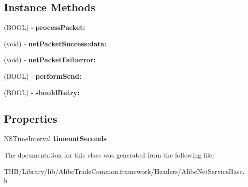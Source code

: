 \subsection*{Instance Methods}
\begin{DoxyCompactItemize}
\item 
\mbox{\label{interface_alibc_net_service_base_a295c051b33b3daa1401be9b3e53b78d7}} 
(B\+O\+OL) -\/ {\bfseries process\+Packet\+:}
\item 
\mbox{\label{interface_alibc_net_service_base_af34cab3a4c3c8341a219e5e6d39fc7ab}} 
(void) -\/ {\bfseries net\+Packet\+Success\+:data\+:}
\item 
\mbox{\label{interface_alibc_net_service_base_aaeb20a70cce1d65ec4084146f3966d54}} 
(void) -\/ {\bfseries net\+Packet\+Fail\+:error\+:}
\item 
\mbox{\label{interface_alibc_net_service_base_a20fd9bfe5273aa03b0f2fe9480e34883}} 
(B\+O\+OL) -\/ {\bfseries perform\+Send\+:}
\item 
\mbox{\label{interface_alibc_net_service_base_a8941633220db9e7aa13cb9c8a81c8895}} 
(B\+O\+OL) -\/ {\bfseries should\+Retry\+:}
\end{DoxyCompactItemize}
\subsection*{Properties}
\begin{DoxyCompactItemize}
\item 
\mbox{\label{interface_alibc_net_service_base_a305b095b753b573082747001b72e7e19}} 
N\+S\+Time\+Interval {\bfseries timeout\+Seconds}
\end{DoxyCompactItemize}


The documentation for this class was generated from the following file\+:\begin{DoxyCompactItemize}
\item 
T\+H\+B/\+Library/lib/\+Alibc\+Trade\+Common.\+framework/\+Headers/Alibc\+Net\+Service\+Base.\+h\end{DoxyCompactItemize}
